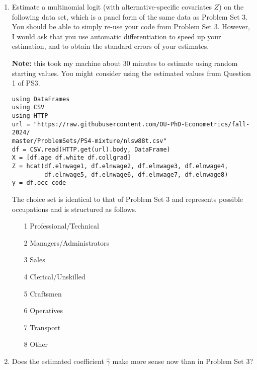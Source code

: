 \documentclass[12pt,english]{article}
\begin{document}
\begin{enumerate}
\item Estimate a multinomial logit (with alternative-specific covariates $Z$) on the following data set, which is a panel form of the same data as Problem Set 3. You should be able to simply re-use your code from Problem Set 3. However, I would ask that you use automatic differentiation to speed up your estimation, and to obtain the standard errors of your estimates.

\textbf{Note:} this took my machine about 30 minutes to estimate using random starting values. You might consider using the estimated values from Question 1 of PS3.

\begin{verbatim}
using DataFrames
using CSV
using HTTP
url = "https://raw.githubusercontent.com/OU-PhD-Econometrics/fall-2024/
master/ProblemSets/PS4-mixture/nlsw88t.csv"
df = CSV.read(HTTP.get(url).body, DataFrame)
X = [df.age df.white df.collgrad]
Z = hcat(df.elnwage1, df.elnwage2, df.elnwage3, df.elnwage4, 
         df.elnwage5, df.elnwage6, df.elnwage7, df.elnwage8)
y = df.occ_code
\end{verbatim}

The choice set is identical to that of Problem Set 3 and represents possible occupations and is structured  as follows.

\begin{enumerate}
    \item[1] Professional/Technical 
    \item[2] Managers/Administrators
    \item[3] Sales                  
    \item[4] Clerical/Unskilled     
    \item[5] Craftsmen              
    \item[6] Operatives             
    \item[7] Transport              
    \item[8] Other                  
\end{enumerate}

\item Does the estimated coefficient $\hat{\gamma}$ make more sense now than in Problem Set 3?


\end{enumerate}
\end{document}
